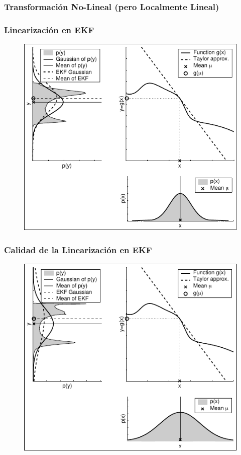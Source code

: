 \begin{frame}
    \frametitle{Transformación No-Lineal (pero Localmente Lineal)}

    \begin{center}
    \end{center}


\end{frame}


\begin{frame}
    \frametitle{Linearización en EKF}
    
    \begin{figure}[!h]
        \includegraphics[width=0.5\columnwidth]{./images/linearization_applied_by_ekf.pdf}
    \end{figure}
\end{frame}


\begin{frame}
    \frametitle{Calidad de la Linearización en EKF}
    
    \begin{figure}[!h]
        \includegraphics[width=0.5\columnwidth]{./images/dependency_approximation_quality_spread.pdf}
    \end{figure}
\end{frame}

